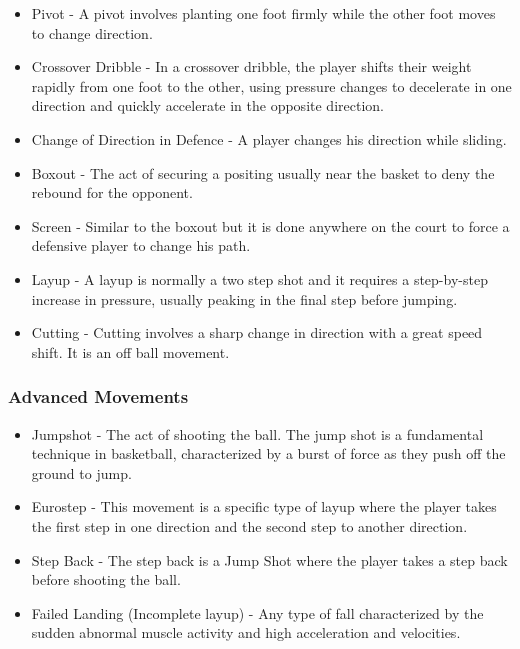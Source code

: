 \begin{itemize}
  \item Pivot - A pivot involves planting one foot firmly while the other foot moves to change direction.
  \item Crossover Dribble - In a crossover dribble, the player shifts their weight rapidly from one foot to the other, using pressure changes to decelerate in one direction and quickly accelerate in the opposite direction.
  \item Change of Direction in Defence - A player changes his direction while sliding.
  \item Boxout - The act of securing a positing usually near the basket to deny the rebound for the opponent.
  \item Screen - Similar to the boxout but it is done anywhere on the court to force a defensive player to change his path.
  \item Layup - A layup is normally a two step shot and it requires a step-by-step increase in pressure, usually peaking in the final step before jumping.
  \item Cutting - Cutting involves a sharp change in direction with a great speed shift. It is an off ball movement.
\end{itemize}

\subsubsection{Advanced Movements}
\label{sssec:advanced_movements}

\begin{itemize}
  \item Jumpshot - The act of shooting the ball. The jump shot is a fundamental technique in basketball, characterized by a burst of force as they push off the ground to jump.
  \item Eurostep - This movement is a specific type of layup where the player takes the first step in one direction and the second step to another direction.
  \item Step Back - The step back is a Jump Shot where the player takes a step back before shooting the ball.
  \item Failed Landing (Incomplete layup) - Any type of fall characterized by the sudden abnormal muscle activity and high acceleration and velocities.
\end{itemize}



